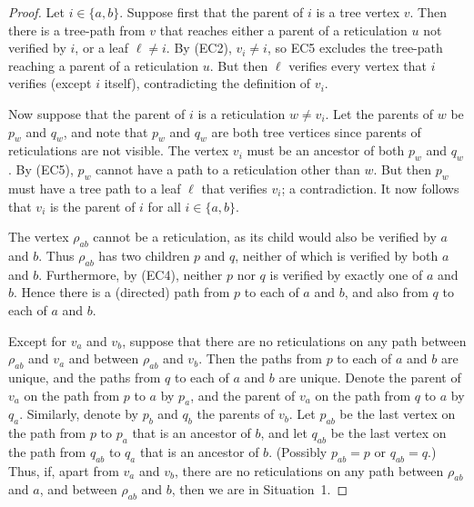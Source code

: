 \documentclass[11pt]{amsart}
\begin{document}
\begin{proof}
Let $i\in \{a, b\}$. Suppose first that the parent of $i$ is a tree vertex $v$. Then there is a tree-path from $v$ that reaches either a parent of a reticulation $u$ not verified by $i$, or a leaf $\ell\neq i$. By (EC2), $v_i\neq i$, so EC5 excludes the tree-path reaching a parent of a reticulation $u$. But then $\ell$ verifies every vertex that $i$ verifies (except $i$ itself), contradicting the definition of $v_i$.

Now suppose that the parent of $i$ is a reticulation $w\neq v_i$. Let the parents of $w$ be $p_w$ and $q_w$, and note that $p_w$ and $q_w$ are both tree vertices since parents of reticulations are not visible. The vertex $v_i$ must be an ancestor of both $p_w$ and $q_w$. By (EC5), $p_w$ cannot have a path to a reticulation other than $w$. But then $p_w$ must have a tree path to a leaf $\ell$ that verifies $v_i$; a contradiction. It now follows that $v_i$ is the parent of $i$ for all $i\in\{a, b\}$.

The vertex $\rho_{ab}$ cannot be a reticulation, as its child would also be verified by $a$ and $b$. Thus $\rho_{ab}$ has two children $p$ and $q$, neither of which is verified by both $a$ and $b$. Furthermore, by (EC4), neither $p$ nor $q$ is verified by exactly one of $a$ and $b$. Hence there is a (directed) path from $p$ to each of $a$ and $b$, and also from $q$ to each of $a$ and $b$.

Except for $v_a$ and $v_b$, suppose that there are no reticulations on any path between $\rho_{ab}$ and $v_a$ and between $\rho_{ab}$ and $v_b$. Then the paths from $p$ to each of $a$ and $b$ are unique, and the paths from $q$ to each of $a$ and $b$ are unique. Denote the parent of $v_a$ on the path from $p$ to $a$ by $p_a$, and the parent of $v_a$ on the path from $q$ to $a$ by $q_a$. Similarly, denote by $p_b$ and $q_b$ the parents of $v_b$. Let $p_{ab}$ be the last vertex on the path from $p$ to $p_a$ that is an ancestor of $b$, and let $q_{ab}$ be the last vertex on the path from $q_{ab}$ to $q_a$ that is an ancestor of $b$. (Possibly $p_{ab}=p$ or $q_{ab}=q$.) Thus, if, apart from $v_a$ and $v_b$, there are no reticulations on any path between $\rho_{ab}$ and $a$, and between $\rho_{ab}$ and $b$, then we are in Situation~1.


\end{proof}
\end{document}
